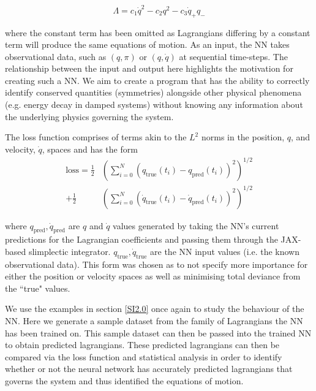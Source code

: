 \documentclass[10pt]{iopart}
\begin{document}
\begin{equation}
	\label{DHOFamily}
	\Lambda = c_1\dot{q}^2 - c_2q^2 - c_3\dot{q}_+q_-
\end{equation}

where the constant term has been omitted as Lagrangians differing by a constant term will produce the same equations of motion. As an input, the NN takes observational data, such as $(q,\pi)$ or $(q,\dot{q})$ at sequential time-steps. The relationship between the input and output here highlights the motivation for creating such a NN. We aim to create a program that has the ability to correctly identify conserved quantities (symmetries) alongside other physical phenomena (e.g. energy decay in damped systems) without knowing any information about the underlying physics governing the system. 

The loss function comprises of terms akin to the $L^2$ norms in the position, $q$, and velocity, $\dot q$, spaces and has the form
\begin{equation}
\begin{split}
		\label{lossfunc}
	\textrm{loss} = \frac{1}{2}&\left(\sum_{i=0}^N (q_{\textrm{true}}(t_i) - q_{\textrm{pred}}(t_i))^2\right)^{1/2} \\ +  \frac{1}{2}&\left(\sum_{i=0}^N (\dot{q}_{\textrm{true}}(t_i) - \dot{q}_{\textrm{pred}}(t_i))^2\right)^{1/2}
\end{split}
\end{equation}

where $q_{\textrm{pred}}, \dot{q}_{\textrm{pred}}$ are $q$ and $\dot q$ values generated by taking the NN's current predictions for the Lagrangian coefficients and passing them through the JAX-based slimplectic integrator. $q_{\textrm{true}}, \dot{q}_{\textrm{true}}$ are the NN input values (i.e. the known observational data). This form was chosen as to not specify more importance for either the position or velocity spaces as well as minimising total deviance from the ``true" values.

We use the examples in section \ref{SI2.0} once again to study the behaviour of the NN. Here we generate a sample dataset from the family of Lagrangians the NN has been trained on. This sample dataset can then be passed into the trained NN to obtain predicted lagrangians. These predicted lagrangians can then be compared via the loss function and statistical analysis in order to identify whether or not the neural network has accurately predicted lagrangians that governs the system and thus identified the equations of motion.
\end{document}
